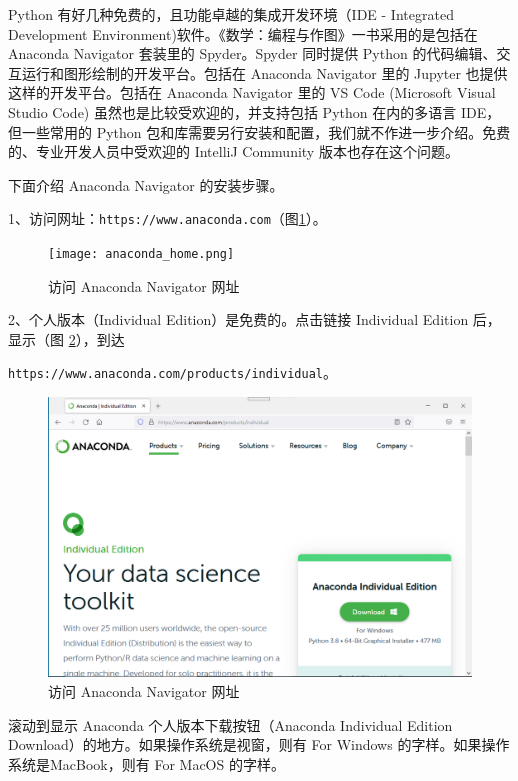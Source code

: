 \documentclass[main.tex]{subfiles}
\begin{document}
	
Python 有好几种免费的，且功能卓越的集成开发环境（IDE - Integrated Development Environment)软件。《数学：编程与作图》一书采用的是包括在
Anaconda Navigator  套装里的 Spyder。Spyder 同时提供 Python 的代码编辑、交互运行和图形绘制的开发平台。包括在 Anaconda Navigator 里的 Jupyter 也提供这样的开发平台。包括在 Anaconda Navigator 里的 VS Code (Microsoft Visual Studio Code) 虽然也是比较受欢迎的，并支持包括 Python 在内的多语言 IDE，但一些常用的 Python 包和库需要另行安装和配置，我们就不作进一步介绍。免费的、专业开发人员中受欢迎的 IntelliJ Community 版本也存在这个问题。

下面介绍 Anaconda Navigator 的安装步骤。

1、访问网址：\texttt{https://www.anaconda.com}（图\ref{fig:1.1}）。

\begin{figure}[h]
	\centering
	\texttt{[image: anaconda\_home.png]}
	\caption{访问 Anaconda Navigator 网址}
	\label{fig:1.1}
\end{figure}

2、个人版本（Individual Edition）是免费的。点击链接 Individual Edition  后，显示（图 \ref{fig:1.2}），到达

\texttt{https://www.anaconda.com/products/individual}。

\begin{figure}[h]
	\centering
	\includegraphics[width=1.0\textwidth]{anaconda_download.png}
	\caption{访问 Anaconda Navigator 网址}
	\label{fig:1.2}
\end{figure}

滚动到显示 Anaconda 个人版本下载按钮（Anaconda Individual Edition Download）的地方。如果操作系统是视窗，则有 For Windows 的字样。如果操作系统是MacBook，则有 For MacOS 的字样。
\end{document}

